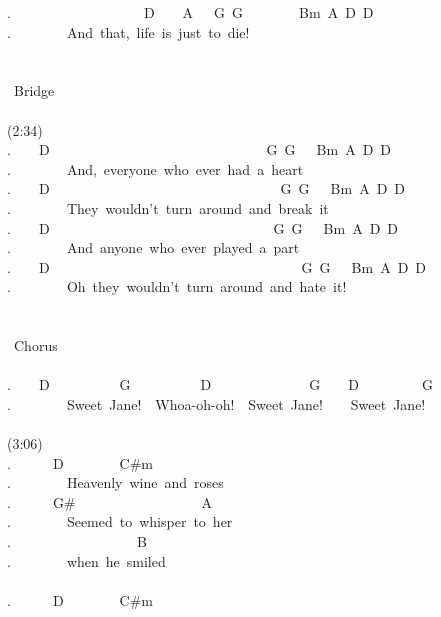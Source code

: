 {.\ \ \ \ \ \ \ \ \ \ \ \ \ \ \ \ \ \ \ D\ \ \ \ A\ \ \ G\ G\ \ \ \ \ \ \ \ Bm\ A\ D\ D\\
.\ \ \ \ \ \ \ \ And\ that,\ life\ is\ just\ to\ die!\\
\\
\\
\lbrack\ Bridge\rbrack\\
\\
(2:34)\\
.\ \ \ \ D\ \ \ \ \ \ \ \ \ \ \ \ \ \ \ \ \ \ \ \ \ \ \ \ \ \ \ \ \ \ \ G\ G\ \ \ Bm\ A\ D\ D\\
.\ \ \ \ \ \ \ \ And,\ everyone\ who\ ever\ had\ a\ heart\\
.\ \ \ \ D\ \ \ \ \ \ \ \ \ \ \ \ \ \ \ \ \ \ \ \ \ \ \ \ \ \ \ \ \ \ \ \ \ G\ G\ \ \ Bm\ A\ D\ D\\
.\ \ \ \ \ \ \ \ They\ wouldn't\ turn\ around\ and\ break\ it\\
.\ \ \ \ D\ \ \ \ \ \ \ \ \ \ \ \ \ \ \ \ \ \ \ \ \ \ \ \ \ \ \ \ \ \ \ \ G\ G\ \ \ Bm\ A\ D\ D\\
.\ \ \ \ \ \ \ \ And\ anyone\ who\ ever\ played\ a\ part\ \\
.\ \ \ \ D\ \ \ \ \ \ \ \ \ \ \ \ \ \ \ \ \ \ \ \ \ \ \ \ \ \ \ \ \ \ \ \ \ \ \ \ G\ G\ \ \ Bm\ A\ D\ D\\
.\ \ \ \ \ \ \ \ Oh\ they\ wouldn't\ turn\ around\ and\ hate\ it!\\
\\
\\
\lbrack\ Chorus\rbrack\\
\\
.\ \ \ \ D\ \ \ \ \ \ \ \ \ \ G\ \ \ \ \ \ \ \ \ \ D\ \ \ \ \ \ \ \ \ \ \ \ \ \ G\ \ \ \ D\ \ \ \ \ \ \ \ \ G\\
.\ \ \ \ \ \ \ \ Sweet\ Jane!\ \ Whoa-oh-oh!\ \ Sweet\ Jane!\ \ \ \ Sweet\ Jane!\\
\\
(3:06)\\
.\ \ \ \ \ \ D\ \ \ \ \ \ \ \ C\#m\ \\
.\ \ \ \ \ \ \ \ Heavenly\ wine\ and\ roses\\
.\ \ \ \ \ \ G\#\ \ \ \ \ \ \ \ \ \ \ \ \ \ \ \ \ \ A\\
.\ \ \ \ \ \ \ \ Seemed\ to\ whisper\ to\ her\\
.\ \ \ \ \ \ \ \ \ \ \ \ \ \ \ \ \ \ B\\
.\ \ \ \ \ \ \ \ when\ he\ smiled\\
\\
.\ \ \ \ \ \ D\ \ \ \ \ \ \ \ C\#m\ \ \ \ \ \ \\
}
